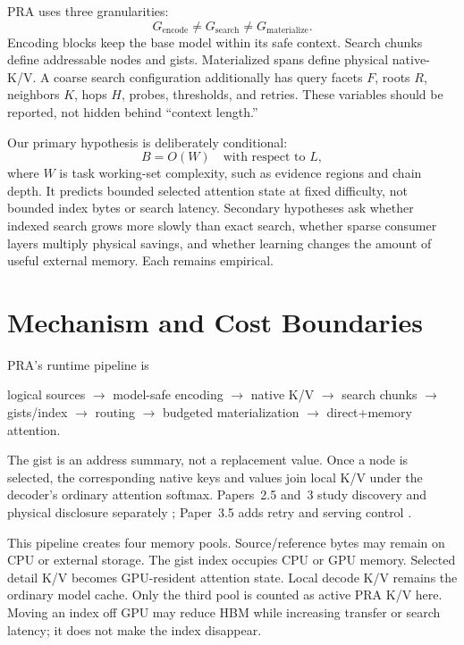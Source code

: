 \documentclass[10pt]{article}
\begin{document}
PRA uses three granularities:
\begin{equation}
  G_{\mathrm{encode}} \ne G_{\mathrm{search}} \ne G_{\mathrm{materialize}}.
\end{equation}
Encoding blocks keep the base model within its safe context. Search chunks define
addressable nodes and gists. Materialized spans define physical native-K/V. A
coarse search configuration additionally has query facets $F$, roots $R$,
neighbors $K$, hops $H$, probes, thresholds, and retries. These variables should
be reported, not hidden behind ``context length.''

Our primary hypothesis is deliberately conditional:
\begin{equation}
  B = O(W) \quad\text{with respect to }L,
\end{equation}
where $W$ is task working-set complexity, such as evidence regions and chain
depth. It predicts bounded selected attention state at fixed difficulty, not
bounded index bytes or search latency. Secondary hypotheses ask whether indexed
search grows more slowly than exact search, whether sparse consumer layers
multiply physical savings, and whether learning changes the amount of useful
external memory. Each remains empirical.

\section{Mechanism and Cost Boundaries}

PRA's runtime pipeline is
\begin{center}
logical sources $\rightarrow$ model-safe encoding $\rightarrow$ native K/V
$\rightarrow$ search chunks $\rightarrow$ gists/index $\rightarrow$ routing
$\rightarrow$ budgeted materialization $\rightarrow$ direct+memory attention.
\end{center}
The gist is an address summary, not a replacement value. Once a node is selected,
the corresponding native keys and values join local K/V under the decoder's
ordinary attention softmax. Papers~2.5 and~3 study discovery and physical
disclosure separately \cite{simao2026iterative,simao2026materialization};
Paper~3.5 adds retry and serving control \cite{simao2026adaptive}.

This pipeline creates four memory pools. Source/reference bytes may remain on
CPU or external storage. The gist index occupies CPU or GPU memory. Selected
detail K/V becomes GPU-resident attention state. Local decode K/V remains the
ordinary model cache. Only the third pool is counted as active PRA K/V here.
Moving an index off GPU may reduce HBM while increasing transfer or search
latency; it does not make the index disappear.
\end{document}
